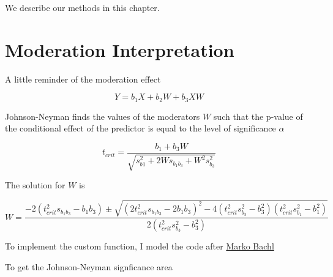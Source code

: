 \documentclass[
]{book}
\begin{document}
We describe our methods in this chapter.

\hypertarget{moderation-interpretation}{%
\section{Moderation Interpretation}\label{moderation-interpretation}}

A little reminder of the moderation effect

\[
Y = b_1 X+ b_2 W + b_3 XW
\]

Johnson-Neyman finds the values of the moderators \(W\) such that the p-value of the conditional effect of the predictor is equal to the level of significance \(\alpha\)

\[
t_{crit} = \frac{b_1 + b_3 W}{\sqrt{s^2_{b1} + 2 Ws_{b_1b_3} + W^2 s^2_{b_3}}}
\]

The solution for \(W\) is

\[
W = \frac{-2(t_{crit}^2 s_{b_1b_3} - b_1b_3)\pm \sqrt{(2t^2_{crit}s_{b_1b_3}- 2b_1 b_3)^2-4(t_{crit}^2s^2_{b_3} - b_3^2)(t_{crit}^2 s^2_{b_1}-b_1^2)}}{2(t^2_{crit}s^2_{b_3}-b^2_3)}
\]

To implement the custom function, I model the code after \href{https://rpubs.com/bachl/jn-plot}{Marko Bachl}

To get the Johnson-Neyman signficance area
\end{document}
